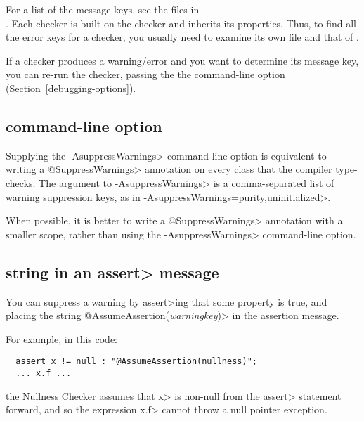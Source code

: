 \noindent
For a list of the message keys, 
see the  files in 
\\
.
Each checker is built on the  checker and inherits its
properties.  Thus, to find all the error keys for a checker, you usually
need to examine its own  file and that of
.

If a checker produces a warning/error and you want to determine its message
key, you can re-run the checker, passing the the 
command-line option (Section~\ref{debugging-options}).


\subsection{ command-line option\label{suppresswarnings-command-line}}

Supplying the \<-AsuppressWarnings> command-line option is equivalent to
writing a \<@SuppressWarnings> annotation on every class that the compiler
type-checks.  The argument to \<-AsuppressWarnings> is a comma-separated
list of warning suppression keys, as in
\<-AsuppressWarnings=purity,uninitialized>.

When possible, it is better to write a \<@SuppressWarnings> annotation with a
smaller scope, rather than using the \<-AsuppressWarnings> command-line option.


\subsection{ string in an \<assert> message\label{assumeassertion}}

\begin{sloppypar}
You can suppress a warning by \<assert>ing that some property is true, and
placing the string \<@AssumeAssertion(\emph{warningkey})> in the assertion
message.
\end{sloppypar}

For example, in this code:

\begin{Verbatim}
  assert x != null : "@AssumeAssertion(nullness)";
  ... x.f ...
\end{Verbatim}

\noindent
the Nullness Checker assumes that \<x> is non-null from the \<assert>
statement forward, and so the expression \<x.f> cannot throw a null pointer
exception.


